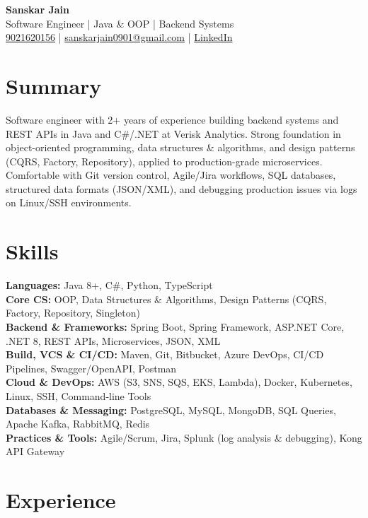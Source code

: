 \documentclass[a4paper,10pt]{article}
\begin{document}
\begin{center}
    {\LARGE \textbf{Sanskar Jain}} \\
    Software Engineer | Java \& OOP | Backend Systems \\
    \href{tel:9021620156}{9021620156} \;|\;
    \href{mailto:sanskarjain0901@gmail.com}{sanskarjain0901@gmail.com} \;|\;
    \href{https://www.linkedin.com/in/sanskar-jain0901/}{LinkedIn}
\end{center}

\vspace{3pt}

\section*{Summary}
Software engineer with 2+ years of experience building backend systems and REST APIs in Java and C\#/.NET at Verisk Analytics. Strong foundation in object-oriented programming, data structures \& algorithms, and design patterns (CQRS, Factory, Repository), applied to production-grade microservices. Comfortable with Git version control, Agile/Jira workflows, SQL databases, structured data formats (JSON/XML), and debugging production issues via logs on Linux/SSH environments.

\section*{Skills}
\textbf{Languages:} Java 8+, C\#, Python, TypeScript \\
\textbf{Core CS:} OOP, Data Structures \& Algorithms, Design Patterns (CQRS, Factory, Repository, Singleton) \\
\textbf{Backend \& Frameworks:} Spring Boot, Spring Framework, ASP.NET Core, .NET 8, REST APIs, Microservices, JSON, XML \\
\textbf{Build, VCS \& CI/CD:} Maven, Git, Bitbucket, Azure DevOps, CI/CD Pipelines, Swagger/OpenAPI, Postman \\
\textbf{Cloud \& DevOps:} AWS (S3, SNS, SQS, EKS, Lambda), Docker, Kubernetes, Linux, SSH, Command-line Tools \\
\textbf{Databases \& Messaging:} PostgreSQL, MySQL, MongoDB, SQL Queries, Apache Kafka, RabbitMQ, Redis \\
\textbf{Practices \& Tools:} Agile/Scrum, Jira, Splunk (log analysis \& debugging), Kong API Gateway

\section*{Experience}
\end{document}
